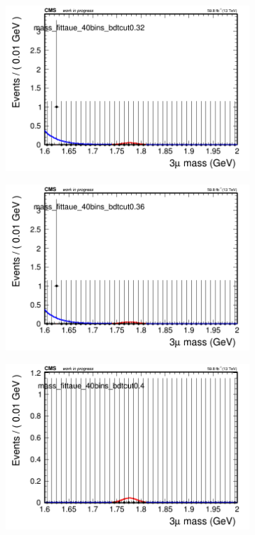 \begin{figure}[H]
\begin{subfigure}{0.2\textwidth}
        \caption{}
    \end{subfigure}
    \begin{subfigure}{0.2\textwidth}
        \includegraphics[width=\textwidth]{power_law/plots/taue/massfit_taue_40bins_bdtcut0.32.png}
        \caption{}
    \end{subfigure}
    \begin{subfigure}{0.2\textwidth}
        \includegraphics[width=\textwidth]{power_law/plots/taue/massfit_taue_40bins_bdtcut0.36.png}
        \caption{}
    \end{subfigure}
    \begin{subfigure}{0.2\textwidth}
        \includegraphics[width=\textwidth]{power_law/plots/taue/massfit_taue_40bins_bdtcut0.4.png}

\end{subfigure}
\end{figure}
